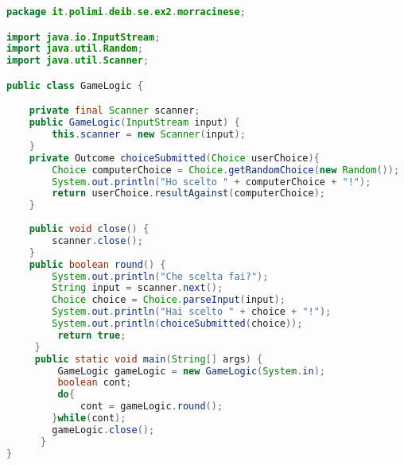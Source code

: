 \documentclass{article}
\begin{document}
\begin{lstlisting}[language=Java,escapechar=|]
package it.polimi.deib.se.ex2.morracinese;

import java.io.InputStream;
import java.util.Random;
import java.util.Scanner;

public class GameLogic {	

    private final Scanner scanner;
    public GameLogic(InputStream input) {
        this.scanner = new Scanner(input);
    }
    private Outcome choiceSubmitted(Choice userChoice){
        Choice computerChoice = Choice.getRandomChoice(new Random());
        System.out.println("Ho scelto " + computerChoice + "!");
        return userChoice.resultAgainst(computerChoice);
    }
    
    public void close() {
        scanner.close();		
    }
    public boolean round() {
        System.out.println("Che scelta fai?");
        String input = scanner.next();
        Choice choice = Choice.parseInput(input);
        System.out.println("Hai scelto " + choice + "!");
        System.out.println(choiceSubmitted(choice));
         return true; 
     }
     public static void main(String[] args) {
         GameLogic gameLogic = new GameLogic(System.in);
         boolean cont;
         do{
             cont = gameLogic.round();
        }while(cont);
        gameLogic.close();
      }
}
\end{lstlisting}
\end{document}
